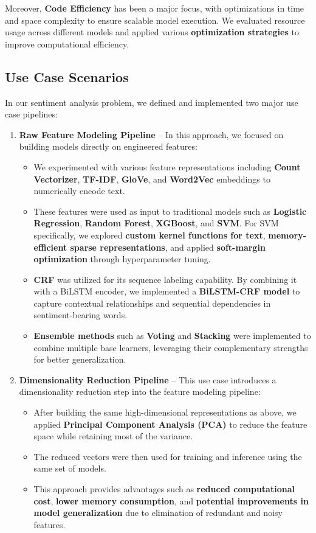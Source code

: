 Moreover, \textbf{Code Efficiency} has been a major focus, with optimizations in time and space complexity to ensure scalable model execution. We evaluated resource usage across different models and applied various \textbf{optimization strategies} to improve computational efficiency.

\subsection{Use Case Scenarios}

In our sentiment analysis problem, we defined and implemented two major use case pipelines:

\begin{enumerate}
    \item \textbf{Raw Feature Modeling Pipeline} – In this approach, we focused on building models directly on engineered features:
    \begin{itemize}
        \item We experimented with various feature representations including \textbf{Count Vectorizer}, \textbf{TF-IDF}, \textbf{GloVe}, and \textbf{Word2Vec} embeddings to numerically encode text.
        \item These features were used as input to traditional models such as \textbf{Logistic Regression}, \textbf{Random Forest}, \textbf{XGBoost}, and \textbf{SVM}. For SVM specifically, we explored \textbf{custom kernel functions for text}, \textbf{memory-efficient sparse representations}, and applied \textbf{soft-margin optimization} through hyperparameter tuning.
        \item \textbf{CRF} was utilized for its sequence labeling capability. By combining it with a BiLSTM encoder, we implemented a \textbf{BiLSTM-CRF model} to capture contextual relationships and sequential dependencies in sentiment-bearing words.
        \item \textbf{Ensemble methods} such as \textbf{Voting} and \textbf{Stacking} were implemented to combine multiple base learners, leveraging their complementary strengths for better generalization.
    \end{itemize}

    \item \textbf{Dimensionality Reduction Pipeline} – This use case introduces a dimensionality reduction step into the feature modeling pipeline:
    \begin{itemize}
        \item After building the same high-dimensional representations as above, we applied \textbf{Principal Component Analysis (PCA)} to reduce the feature space while retaining most of the variance.
        \item The reduced vectors were then used for training and inference using the same set of models.
        \item This approach provides advantages such as \textbf{reduced computational cost}, \textbf{lower memory consumption}, and \textbf{potential improvements in model generalization} due to elimination of redundant and noisy features.
    \end{itemize}
\end{enumerate}

